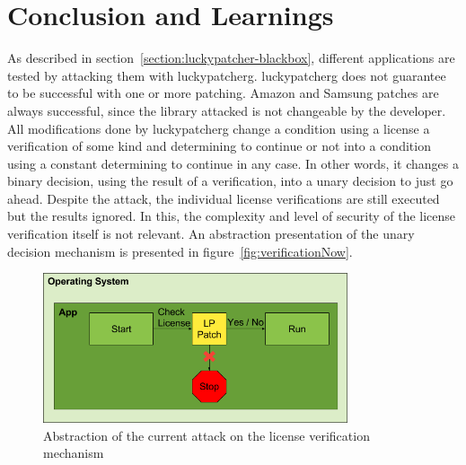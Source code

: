 \section{Conclusion and Learnings} \label{section:luckypatcher-learnings}
As described in section~\ref{section:luckypatcher-blackbox}, different applications are tested by attacking them with \gls{luckypatcherg}.
\gls{luckypatcherg} does not guarantee to be successful with one or more patching.
Amazon and Samsung patches are always successful, since the library attacked is not changeable by the developer.
\newline
\newline
All modifications done by \gls{luckypatcherg} change a condition using a license a verification of some kind and determining to continue or not into a condition using a constant determining to continue in any case.
In other words, it changes a binary decision, using the result of a verification, into a unary decision to just go ahead.
Despite the attack, the individual license verifications are still executed but the results ignored.
In this, the complexity and level of security of the license verification itself is not relevant.
An abstraction presentation of the unary decision mechanism is presented in figure~\ref{fig:verificationNow}.
\newline
\begin{figure}[h]
    \centering
    \includegraphics[width=0.8\textwidth]{data/verificationNowAttack.png}
    \caption{Abstraction of the current attack on the license verification mechanism}
    \label{fig:verificationNowAttack}
\end{figure}
